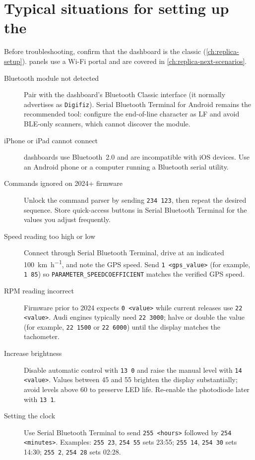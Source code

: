 \chapter{Typical situations for setting up the \ReplicaGenOne{}}\label{ch:replica-scenarios}

Before troubleshooting, confirm that the dashboard is the classic \ReplicaGenOne{} (\autoref{ch:replica-setup}). \ReplicaNextLong{} panels use a Wi-Fi portal and are covered in \autoref{ch:replica-next-scenarios}.

\begin{description}
    \item[Bluetooth module not detected] Pair with the dashboard's Bluetooth Classic interface (it normally advertises as \texttt{Digifiz}). Serial Bluetooth Terminal for Android remains the recommended tool: configure the end-of-line character as LF and avoid BLE-only scanners, which cannot discover the module.
    \item[iPhone or iPad cannot connect] \ReplicaGenOneShort{} dashboards use Bluetooth~2.0 and are incompatible with iOS devices. Use an Android phone or a computer running a Bluetooth serial utility.
    \item[Commands ignored on 2024+ firmware] Unlock the command parser by sending \verb|234 123|, then repeat the desired sequence. Store quick-access buttons in Serial Bluetooth Terminal for the values you adjust frequently.
    \item[Speed reading too high or low] Connect through Serial Bluetooth Terminal, drive at an indicated \SI{100}{\kilo\metre\per\hour}, and note the GPS speed. Send \verb|1 <gps_value>| (for example, \verb|1 85|) so \texttt{PARAMETER\_SPEEDCOEFFICIENT} matches the verified GPS speed.
    \item[RPM reading incorrect] Firmware prior to 2024 expects \verb|0 <value>| while current releases use \verb|22 <value>|. Audi engines typically need \verb|22 3000|; halve or double the value (for example, \verb|22 1500| or \verb|22 6000|) until the display matches the tachometer.
    \item[Increase brightness] Disable automatic control with \verb|13 0| and raise the manual level with \verb|14 <value>|. Values between 45 and 55 brighten the display substantially; avoid levels above 60 to preserve LED life. Re-enable the photodiode later with \verb|13 1|.
    \item[Setting the clock] Use Serial Bluetooth Terminal to send \verb|255 <hours>| followed by \verb|254 <minutes>|. Examples: \verb|255 23|, \verb|254 55| sets 23:55; \verb|255 14|, \verb|254 30| sets 14:30; \verb|255 2|, \verb|254 28| sets 02:28.

\end{description}
